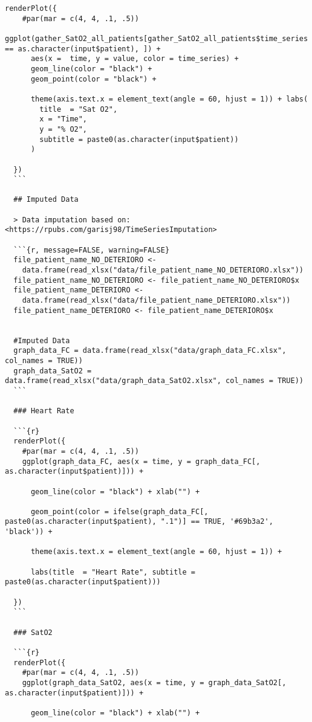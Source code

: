 \begin{lstlisting}[style=mystyle,caption={Código Visualización de los Datos}, label={lst:codigo-visualizacion}]
  renderPlot({
    #par(mar = c(4, 4, .1, .5))
    ggplot(gather_SatO2_all_patients[gather_SatO2_all_patients$time_series == as.character(input$patient), ]) +
      aes(x =  time, y = value, color = time_series) +
      geom_line(color = "black") +
      geom_point(color = "black") +
      
      theme(axis.text.x = element_text(angle = 60, hjust = 1)) + labs(
        title  = "Sat O2",
        x = "Time",
        y = "% O2",
        subtitle = paste0(as.character(input$patient))
      )
    
  })
  ```
  
  ## Imputed Data
  
  > Data imputation based on: <https://rpubs.com/garisj98/TimeSeriesImputation>
  
  ```{r, message=FALSE, warning=FALSE}
  file_patient_name_NO_DETERIORO <-
    data.frame(read_xlsx("data/file_patient_name_NO_DETERIORO.xlsx"))
  file_patient_name_NO_DETERIORO <- file_patient_name_NO_DETERIORO$x
  file_patient_name_DETERIORO <-
    data.frame(read_xlsx("data/file_patient_name_DETERIORO.xlsx"))
  file_patient_name_DETERIORO <- file_patient_name_DETERIORO$x
  
  
  #Imputed Data
  graph_data_FC = data.frame(read_xlsx("data/graph_data_FC.xlsx", col_names = TRUE))
  graph_data_SatO2 = data.frame(read_xlsx("data/graph_data_SatO2.xlsx", col_names = TRUE))
  ```
  
  ### Heart Rate
  
  ```{r}
  renderPlot({
    #par(mar = c(4, 4, .1, .5))
    ggplot(graph_data_FC, aes(x = time, y = graph_data_FC[, as.character(input$patient)])) +
      
      geom_line(color = "black") + xlab("") +
      
      geom_point(color = ifelse(graph_data_FC[, paste0(as.character(input$patient), ".1")] == TRUE, '#69b3a2', 'black')) +
      
      theme(axis.text.x = element_text(angle = 60, hjust = 1)) +
      
      labs(title  = "Heart Rate", subtitle = paste0(as.character(input$patient)))
    
  })
  ```
  
  ### SatO2
  
  ```{r}
  renderPlot({
    #par(mar = c(4, 4, .1, .5))
    ggplot(graph_data_SatO2, aes(x = time, y = graph_data_SatO2[, as.character(input$patient)])) +
      
      geom_line(color = "black") + xlab("") +
      

\end{lstlisting}
